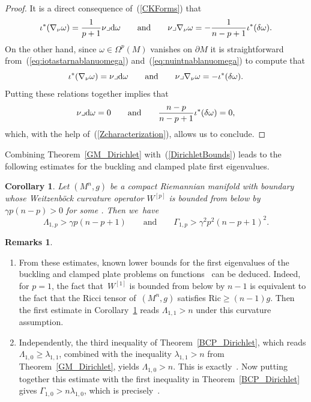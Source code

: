 \documentclass[pdftex]{sigma}
\numberwithin{equation}{section}
\newtheorem{Corollary}[Theorem]{Corollary}
\theoremstyle{definition}
\newtheorem{Remarks}[Theorem]{Remarks}
\begin{document}
\begin{proof} It is a direct consequence of~(\ref{CKForms}) that
\[
\iota^*(\nabla_\nu\omega)=\frac{1}{p+1}\nu\lrcorner {\rm d}\omega\qquad\text{and}\qquad\nu\lrcorner\nabla_\nu\omega=-\frac{1}{n-p+1}\iota^*(\delta\omega).
\]
On the other hand, since $\omega\in\Omega^p(M)$ vanishes on $\partial M$ it is straightforward from~(\ref{eq:iotastarnablanuomega}) and~(\ref{eq:nuintnablanuomega}) to compute that
\[
\iota^*(\nabla_\nu\omega)=\nu\lrcorner {\rm d}\omega\qquad\text{and}\qquad\nu\lrcorner\nabla_\nu\omega=-\iota^*(\delta\omega).
\]
Putting these relations together implies that
\[
\nu\lrcorner {\rm d}\omega=0 \qquad\text{and}\qquad\frac{n-p}{n-p+1}\iota^*(\delta\omega)=0,
\]
which, with the help of~(\ref{Zcharacterization}), allows us to conclude.
\end{proof}

Combining Theorem~\ref{GM_Dirichlet} with~(\ref{DirichletBounds}) leads to the following estimates for the buckling and clamped plate first eigenvalues.

\begin{Corollary}\label{BCDL}
Let $(M^n,g)$ be a compact Riemannian manifold with boundary whose Weitzen\-b\"ock curvature operator $W^{[p]}$ is bounded from below by $\gamma p(n-p)>0$ for some .
Then we~have
\[
\Lambda_{1,p}>\gamma p(n-p+1)\qquad\text{and}\qquad\Gamma_{1,p}>\gamma^2 p^2(n-p+1)^2.
\]
\end{Corollary}

\begin{Remarks}%
\noindent\begin{enumerate}\itemsep=0pt
\item From these estimates, known lower bounds for the first eigenvalues of the buckling and clamped plate problems on functions~\cite{ChenChengWangXia2012} can be deduced.
Indeed, for $p=1$, the fact that~$W^{[1]}$ is bounded from below by $n-1$ is equivalent to the fact that the Ricci tensor of~$(M^n,g)$ satisfies $\mathrm{Ric}\geq (n-1)g$.
Then the first estimate in Corollary~\ref{BCDL} reads $\Lambda_{1,1}>n$ under this curvature assumption.
\item Independently, the third inequality of Theorem~\ref{BCP_Dirichlet}, which reads $\Lambda_{1,0}\geq \lambda_{1,1}$, combined with the inequality $\lambda_{1,1}>n$ from Theorem~\ref{GM_Dirichlet}, yields $\Lambda_{1,0}>n$.
This is exactly~\cite[Theorem~1.6]{ChenChengWangXia2012}.
Now putting together this estimate with the first inequality in Theorem~\ref{BCP_Dirichlet} gives $\Gamma_{1,0}>n\lambda_{1,0}$, which is precisely~\cite[Theorem 1.5]{ChenChengWangXia2012}.
\end{enumerate}
\end{Remarks}
\end{document}
